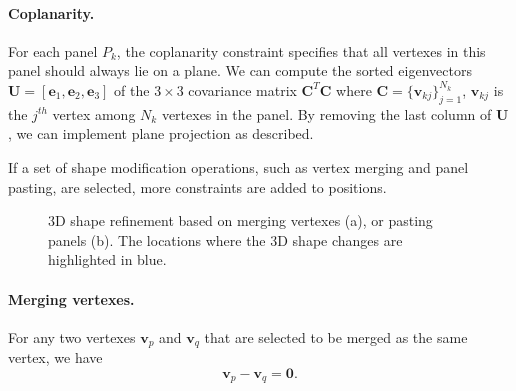 \paragraph{Coplanarity.} {For each panel $P_{k}$, the coplanarity constraint specifies that all vertexes in this panel should always lie on a plane. 
We can compute the sorted eigenvectors $\mathbf{U} = [\mathbf{e}_1, \mathbf{e}_2, \mathbf{e}_3]$ of the $ 3 \times 3$ covariance matrix $\mathbf{C}^T\mathbf{C}$ where $\mathbf{C} = \{\mathbf{v}_{kj}\}_{j=1}^{N_k}$, $\mathbf{v}_{kj}$ is the $j^{th}$ vertex among $N_k$ vertexes in the panel. By removing the last column of $\mathbf{U}$, we can implement plane projection as \cite{Bouaziz:2012:SSD:2346796.2346802} described.


If a set of shape modification operations, such as vertex merging and panel pasting, are selected, more constraints are added to  positions. 
%

\begin{figure}
	\centering
	\caption{3D shape refinement based on merging vertexes (a), or pasting panels (b). The locations where the 3D shape changes are highlighted in blue.  }
	\label{fig:shaperefinement}
\end{figure}

\paragraph{Merging vertexes.} 
For any two vertexes $\mathbf{v}_p$ and $\mathbf{v}_q$ that are selected to be merged as the same vertex, we have 
\begin{equation}
\mathbf{v}_p - \mathbf{v}_q = \mathbf{0}.
\label{equ:point}
\end{equation}

}
